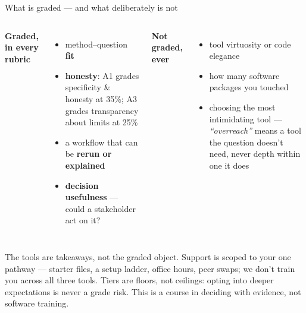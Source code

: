 \documentclass[aspectratio=169,10pt]{beamer}
\newcommand{\muted}[1]{{\color{cMute}#1}}
\begin{document}
\begin{frame}{What is graded --- and what deliberately is not}
  \begin{columns}[T]
    \textbf{Graded, in every rubric}
    \begin{itemize}
      \item method--question \textbf{fit}
      \item \textbf{honesty}: A1 grades specificity \& honesty at 35\%;
            A3 grades transparency about limits at 25\%
      \item a workflow that can be \textbf{rerun or explained}
      \item \textbf{decision usefulness} --- could a stakeholder act on it?
    \end{itemize}
    \textbf{\muted{Not graded, ever}}
    \begin{itemize}
      \item tool virtuosity or code elegance
      \item how many software packages you touched
      \item choosing the most intimidating tool ---
            \emph{``overreach''} means a tool the question doesn't need,
            never depth within one it does
    \end{itemize}
  \end{columns}
  \vspace{2.5mm}
  \alert{The tools are takeaways, not the graded object.} Support is scoped to
  your one pathway --- starter files, a setup ladder, office hours, peer
  swaps; we don't train you across all three tools. Tiers are floors, not
  ceilings: opting into deeper expectations is never a grade risk. This is a
  course in deciding with evidence, not software training.
\end{frame}
\end{document}

